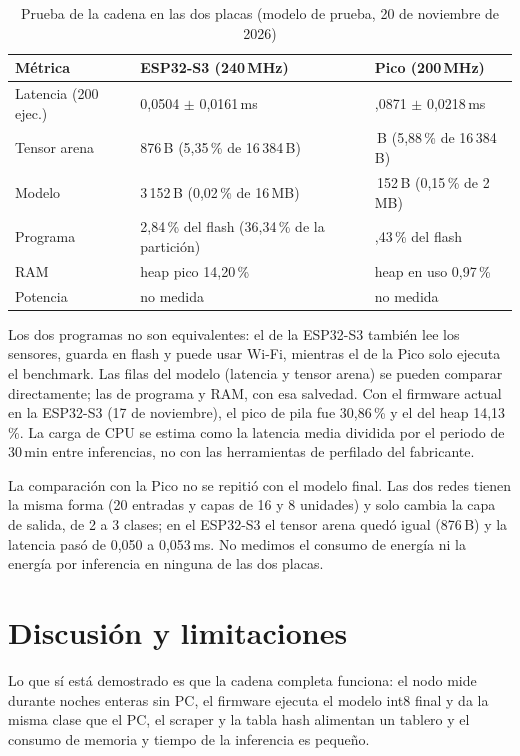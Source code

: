 \documentclass[conference]{IEEEtran}
\begin{document}
\begin{table}[t]
\caption{Prueba de la cadena en las dos placas (modelo de prueba, 20 de noviembre de 2026)}
\label{tab:rec}
\centering
\small
\begin{tabular}{@{}>{\raggedright}p{1.9cm}>{\raggedright}p{2.9cm}>{\raggedright\arraybackslash}p{2.9cm}@{}}
\toprule
M\'etrica & ESP32-S3 (240\,MHz) & Pico (200\,MHz) \\
\midrule
Latencia (200 ejec.) & 0,0504 $\pm$ 0,0161\,ms & 0,0871 $\pm$ 0,0218\,ms \\
Tensor arena & 876\,B (5,35\,\% de 16\,384\,B) & 964\,B (5,88\,\% de 16\,384\,B) \\
Modelo & 3\,152\,B (0,02\,\% de 16\,MB) & 3\,152\,B (0,15\,\% de 2\,MB) \\
Programa & 2,84\,\% del flash (36,34\,\% de la partici\'on) & 7,43\,\% del flash \\
RAM & heap pico 14,20\,\% & heap en uso 0,97\,\% \\
Potencia & no medida & no medida \\
\bottomrule
\end{tabular}
\end{table}

Los dos programas no son equivalentes: el de la ESP32-S3 tambi\'en lee los sensores, guarda en flash y puede usar Wi-Fi, mientras el de la Pico solo ejecuta el benchmark. Las filas del modelo (latencia y tensor arena) se pueden comparar directamente; las de programa y RAM, con esa salvedad. Con el firmware actual en la ESP32-S3 (17 de noviembre), el pico de pila fue 30,86\,\% y el del heap 14,13\,\%. La carga de CPU se estima como la latencia media dividida por el periodo de 30\,min entre inferencias, no con las herramientas de perfilado del fabricante.

La comparaci\'on con la Pico no se repiti\'o con el modelo final. Las dos redes tienen la misma forma (20 entradas y capas de 16 y 8 unidades) y solo cambia la capa de salida, de 2 a 3 clases; en el ESP32-S3 el tensor arena qued\'o igual (876\,B) y la latencia pas\'o de 0,050 a 0,053\,ms. No medimos el consumo de energ\'ia ni la energ\'ia por inferencia en ninguna de las dos placas.

\section{Discusi\'on y limitaciones}
Lo que s\'i est\'a demostrado es que la cadena completa funciona: el nodo mide durante noches enteras sin PC, el firmware ejecuta el modelo int8 final y da la misma clase que el PC, el scraper y la tabla hash alimentan un tablero y el consumo de memoria y tiempo de la inferencia es peque\~no.
\end{document}
